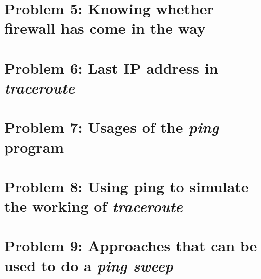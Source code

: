 \documentclass[]{report}
\begin{document}
\section{Problem 5: Knowing whether firewall has come in the way}

\section{Problem 6: Last IP address in \textit{traceroute}}

\section{Problem 7: Usages of the \textit{ping} program}

\section{Problem 8: Using ping to simulate the working of \textit{traceroute}}

\section{Problem 9: Approaches that can be used to do a \textit{ping sweep}}
\end{document}
